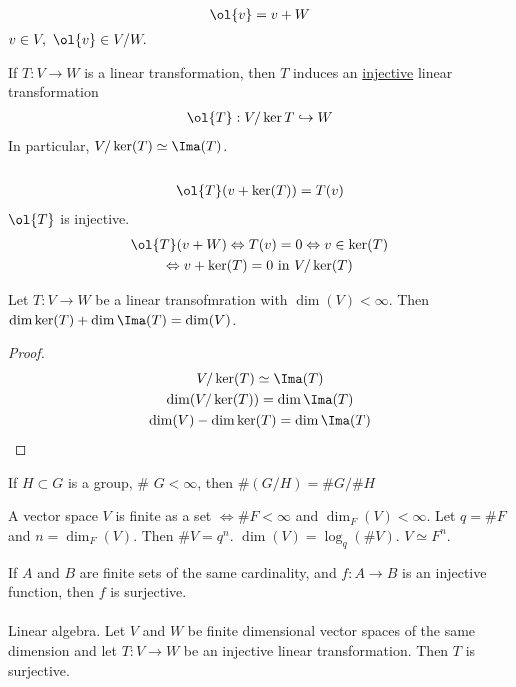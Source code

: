 \documentclass[class=scrartcl, crop=false]{standalone}
\begin{document}
\begin{note}
  \begin{gather*}
    \ol{v} = v + W
  \end{gather*} 
  $v \in V, \ \ol{v} \in V / W.$
\end{note} 


\begin{theorem}
  If $T: V \to W$ is a linear transformation, then $T$ induces an \ul{injective} linear transformation
  \begin{gather*}
    \ol{T}: V / \ker{T} \hookrightarrow W
  \end{gather*} 
  In particular, $V / \ker(T) \simeq \Ima(T)$.
  \\\\
  \begin{gather*}
    \ol{T}(v + \ker(T)) = T(v)
  \end{gather*} 
  $\ol{T}$ is injective.
  \begin{gather*}
    \ol{T}(v + W) \Leftrightarrow T(v) = 0 \Leftrightarrow v \in \ker(T) \\
    \Leftrightarrow v + \ker(T) = 0 \ \text{in} \ V / \ker(T)
  \end{gather*} 
\end{theorem} 

\begin{theorem}
  Let $T: V \to W$ be a linear transofmration with $\dim(V) < \infty$. Then $\dim\ker(T) + \dim\Ima(T) = \dim(V)$.
  \begin{proof}
    \begin{gather*}
      V / \ker(T) \simeq \Ima(T) \\
      \dim(V / \ker(T)) = \dim\Ima(T) \\
      \dim(V) - \dim\ker(T) = \dim\Ima(T)
    \end{gather*} 
  \end{proof} 
  \begin{remark}
    If $H \subset G$ is a group, \# $G < \infty$, then $\#(G / H) = \# G / \#H$ %
  \end{remark} 
\end{theorem} 

A vector space $V$ is finite as a set $\Leftrightarrow \# F < \infty$ and $\dim_F(V) < \infty$. Let $q = \# F$ and $n = \dim_F(V)$. Then $\# V = q^n$. $\dim(V) = \log_q(\# V)$. $V \simeq F^n$.

\begin{theorem}
  If $A$ and $B$ are finite sets of the same cardinality, and $f: A \to B$ is an injective function, then $f$ is surjective.
  \\\\
  Linear algebra. Let $V$ and $W$ be finite dimensional vector spaces of the same dimension and let $T: V \to W$ be an injective linear transformation. Then $T$ is surjective.
\end{theorem} 
\end{document}
